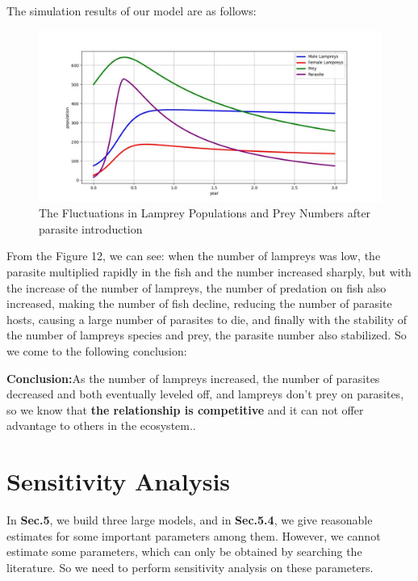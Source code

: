 \documentclass[12pt]{article}  %
\begin{document}
The simulation results of our model are as follows:
 \begin{figure}[H] %
 	\centering  %
 	\includegraphics[width=.6\textwidth]{test(2).jpg} %
 	\caption{The Fluctuations in Lamprey Populations and Prey Numbers after parasite introduction}
 \end{figure}
 \vspace{-0.4cm}
 From the Figure 12, we can see: when the number of lampreys was low, the parasite multiplied rapidly in the fish and the number increased sharply, but with the increase of the number of lampreys, the number of predation on fish also increased, making the number of fish decline, reducing the number of parasite hosts, causing a large number of parasites to die, and finally with the stability of the number of lampreys species and prey, the parasite number also stabilized.  So we come to the following conclusion:
 
 \textbf{Conclusion:}As the number of lampreys increased, the number of parasites decreased and both eventually leveled off, and lampreys don't prey on parasites, so we know that\textbf{ the relationship is competitive} and it can not offer advantage to others in the ecosystem..

\section{Sensitivity Analysis}
In \textbf{Sec.5}, we build three large models, and in\textbf{ Sec.5.4}, we give reasonable estimates for some important parameters among them. However, we cannot estimate some parameters, which can only be obtained by searching the literature. So we need to perform sensitivity analysis on these parameters.
\end{document}
